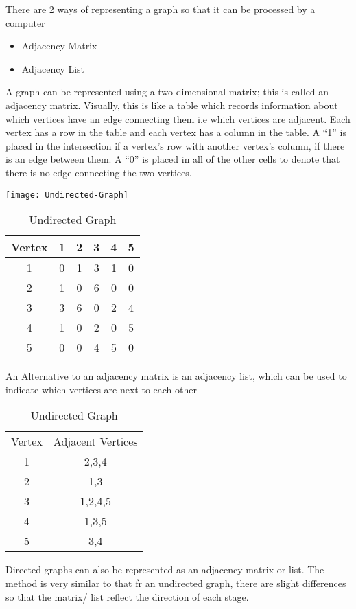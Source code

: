   There are 2 ways of representing a graph so that it can be processed by a computer
  \begin{itemize}
  	\item Adjacency Matrix
  	\item Adjacency List
  \end{itemize}
  
  A graph can be represented using a two-dimensional matrix; this is called an adjacency matrix. Visually, this is like a table which records information about which vertices have an edge connecting them i.e which vertices are adjacent. Each vertex has a row in the table and each vertex has a column in the table. A ``1'' is placed in the intersection if a vertex's row with another vertex's column, if there is an edge between them. A ``0'' is placed in all of the other cells to denote that there is no edge connecting the two vertices.
  
  \texttt{[image: Undirected-Graph]}
  
  \begin{table}[H]
	  	\begin{tabular}{c | c c c c c}
	  		Vertex	&	1	&	2	&	3	&	4	&	5 	\\ \hline
	  		1		&	0	&	1	&	3	&	1	&	0	\\
	  		2		&	1	&	0	&	6	&	0	&	0	\\
	  		3		&	3	&	6	&	0	&	2	&	4	\\
	  		4		&	1	&	0	&	2	&	0	&	5	\\
	  		5		&	0	&	0	&	4	&	5	&	0	\\
	  	\end{tabular}
  	\caption{Undirected Graph}
  \end{table}


  An Alternative to an adjacency matrix is an adjacency list, which can be used to indicate which vertices are next to each other
  \begin{table}[H]
  	\caption{Undirected Graph}
  	\begin{tabular}{cc}
  		Vertex	&	Adjacent Vertices \\
  		1		&	2,3,4	\\
  		2		&	1,3	\\
  		3		&	1,2,4,5	\\
  		4		&	1,3,5	\\
  		5		&	3,4	\\
  	\end{tabular}
  \end{table}


  Directed graphs can also be represented as an adjacency matrix or list. The method is very similar to that fr an undirected graph, there are slight differences so that the matrix/ list reflect the direction of each stage.
  
